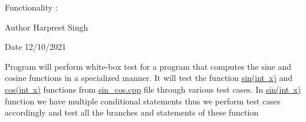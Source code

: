 Functionality \+: ~\newline


\begin{DoxyAuthor}{Author}
Harpreet Singh 
\end{DoxyAuthor}
\begin{DoxyDate}{Date}
12/10/2021
\end{DoxyDate}
Program will perform white-\/box test for a program that computes the sine and cosine functions in a specialized manner. It will test the function \mbox{\hyperlink{sin__cos_8h_a13c31ca258a4339a1b0b21e6222b13dd}{sin(int x)}} and \mbox{\hyperlink{sin__cos_8h_a539ff788abfcbf98c54a12d14728b89b}{cos(int x)}} functions from \mbox{\hyperlink{sin__cos_8cpp}{sin\+\_\+cos.\+cpp}} file through various test cases. In \mbox{\hyperlink{sin__cos_8h_a13c31ca258a4339a1b0b21e6222b13dd}{sin(int x)}} function we have multiple conditional statements thus we perform test cases accordingly and test all the branches and statements of these function 